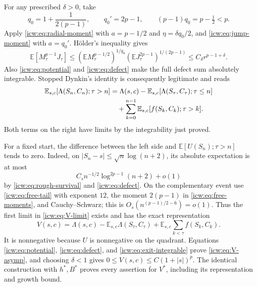\documentclass[11pt,letterpaper]{article}
\theoremstyle{remark}\newtheorem{remark}[theorem]{Remark}
\newcommand{\E}{\mathbb E}
\newcommand{\1}{\mathbf1}
\begin{document}
For any prescribed $\delta>0$, take
\[
 q_0=1+\frac1{2(p-1)},\qquad q_0'=2p-1,
 \qquad(p-1)q_0=p-\tfrac12<p.
\]
Apply \eqref{icw:eq:radial-moment} with $a=p-1/2$ and
$\eta=\delta q_0/2$, and \eqref{icw:eq:jump-moment} with $a=q_0'$.
Hölder's inequality gives
\begin{equation}\label{icw:eq:exit-integrable}
 \E[M_\tau^{p-1}J_\tau]
 \le(\E M_\tau^{p-1/2})^{1/q_0}
       (\E J_\tau^{2p-1})^{1/(2p-1)}
 \le C_\delta r^{p-1+\delta}.
\end{equation}
Also \eqref{icw:eq:potential} and \eqref{icw:eq:defect} make the full defect
sum absolutely integrable. Stopped Dynkin's identity is consequently
legitimate and reads
\begin{align}\label{icw:eq:Dynkin}
 \E_{s,c}[\Lambda(S_n,C_n);\tau>n]
 &=\Lambda(s,c)-\E_{s,c}[\Lambda(S_\tau,C_\tau);\tau\le n]\notag\\
 &\quad+\sum_{k=0}^{n-1}\E_{s,c}[f(S_k,C_k);\tau>k].
\end{align}
Both terms on the right have limits by the integrability just proved.

For a fixed start, the difference between the left side and
$\E[U(S_n);\tau>n]$ tends to zero. Indeed, on
$|S_n-s|\le\sqrt n\log(n+2)$, its absolute expectation is at most
\[
 C_s n^{-1/2}\log^{2p-1}(n+2)+o(1)
\]
by \eqref{icw:eq:rough-survival} and \eqref{icw:eq:defect}. On the complementary
event use \eqref{icw:eq:free-tail} with exponent $12$, the moment
$2(p-1)$ in \eqref{icw:eq:free-moments}, and Cauchy--Schwarz; this is
$O_s(n^{(p-1)/2-6})=o(1)$. Thus the first limit in
\eqref{icw:eq:V-limit} exists and has the exact representation
\begin{equation}\label{icw:eq:V-representation}
 V(s,c)=\Lambda(s,c)-\E_{s,c}\Lambda(S_\tau,C_\tau)
                +\E_{s,c}\sum_{k<\tau}f(S_k,C_k).
\end{equation}
It is nonnegative because $U$ is nonnegative on the quadrant.
Equations \eqref{icw:eq:potential}, \eqref{icw:eq:defect}, and
\eqref{icw:eq:exit-integrable} prove \eqref{icw:eq:V-asymp}, and choosing
$\delta<1$ gives $0\le V(s,c)\le C(1+|s|)^p$.
The identical construction with $h^*,B^*$ proves every assertion for
$V^*$, including its representation and growth bound.
\end{document}
